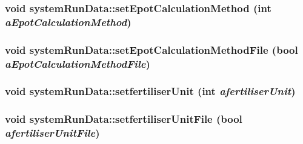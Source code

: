 \label{classsystem_run_data_abf669a871b0827b06932cb78fafcc8af}
\hypertarget{classsystem_run_data_a994f764f2fd1ac3b25c5026b77126b0f}{
\subsubsection[{setEpotCalculationMethod}]{\setlength{\rightskip}{0pt plus 5cm}void systemRunData::setEpotCalculationMethod (int {\em aEpotCalculationMethod})}}
\label{classsystem_run_data_a994f764f2fd1ac3b25c5026b77126b0f}
\hypertarget{classsystem_run_data_af6065fc43b9ed294e278a38f50eaa9cd}{
\subsubsection[{setEpotCalculationMethodFile}]{\setlength{\rightskip}{0pt plus 5cm}void systemRunData::setEpotCalculationMethodFile (bool {\em aEpotCalculationMethodFile})}}
\label{classsystem_run_data_af6065fc43b9ed294e278a38f50eaa9cd}
\hypertarget{classsystem_run_data_aebe119385870aec926764d6918cde81c}{
\subsubsection[{setfertiliserUnit}]{\setlength{\rightskip}{0pt plus 5cm}void systemRunData::setfertiliserUnit (int {\em afertiliserUnit})}}
\label{classsystem_run_data_aebe119385870aec926764d6918cde81c}
\hypertarget{classsystem_run_data_adfa8b92e71fd5d8dff2a8beb1e9a1a80}{
\subsubsection[{setfertiliserUnitFile}]{\setlength{\rightskip}{0pt plus 5cm}void systemRunData::setfertiliserUnitFile (bool {\em afertiliserUnitFile})}}
